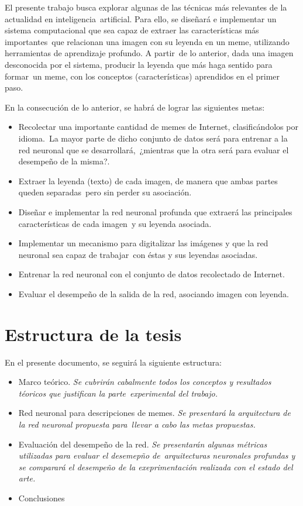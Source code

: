 \noindent
El presente trabajo busca explorar algunas de las técnicas más relevantes de la actualidad en inteligencia\
artificial. Para ello, se diseñará e implementar un sistema computacional que sea capaz de extraer las características más importantes\
que relacionan una imagen con su leyenda en un meme, utilizando herramientas de aprendizaje profundo. A partir\
de lo anterior, dada una imagen desconocida por el sistema, producir la leyenda que más haga sentido para formar\
un meme, con los conceptos (características) aprendidos en el primer paso.\par
En la consecución de lo anterior, se habrá de lograr las siguientes metas:
\begin{itemize}
\item Recolectar una importante cantidad de memes de Internet, clasificándolos por idioma.\
  La mayor parte de dicho conjunto de datos será para entrenar a la red neuronal que se desarrollará,\
  ¿mientras que la otra será para evaluar el desempeño de la misma?.
\item Extraer la leyenda (texto) de cada imagen, de manera que ambas partes queden separadas\
  pero sin perder su asociación.
\item Diseñar e implementar la red neuronal profunda que extraerá las principales características de cada imagen\
  y su leyenda asociada.
\item Implementar un mecanismo para digitalizar las imágenes y que la red neuronal sea capaz de trabajar\
  con éstas y sus leyendas asociadas.
\item Entrenar la red neuronal con el conjunto de datos recolectado de Internet.
\item Evaluar el desempeño de la salida de la red, asociando imagen con leyenda.
\end{itemize}

\section{Estructura de la tesis}

\noindent
En el presente documento, se seguirá la siguiente estructura:
\begin{itemize}
\item Marco teórico. \emph{Se cubrirán cabalmente todos los conceptos y resultados téoricos que justifican la parte}\
  \emph{experimental del trabajo.}
\item Red neuronal para descripciones de memes. \emph{Se presentará la arquitectura de la red neuronal propuesta para}\
  \emph{llevar a cabo las metas propuestas.}
\item Evaluación del desempeño de la red. \emph{Se presentarán algunas métricas utilizadas para evaluar el desemepño de}\
  \emph{arquitecturas neuronales profundas y se comparará el desempeño de la exeprimentación realizada con el estado del arte.}
\item Conclusiones
\end{itemize}

